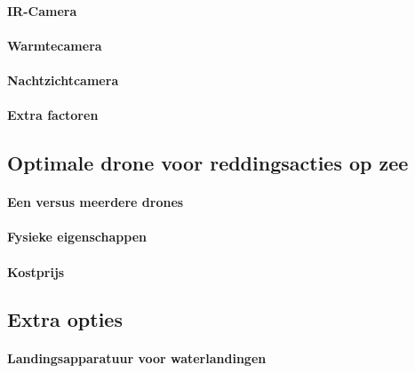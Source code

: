 \paragraph{IR-Camera}

\lipsum[1-2]

\paragraph{Warmtecamera}

\lipsum[1-2]

\paragraph{Nachtzichtcamera}

\lipsum[1-2]

\paragraph{Extra factoren}

\lipsum[1-2]

\subsection{Optimale drone voor reddingsacties op zee}

\paragraph{Een versus meerdere drones}

\lipsum[1-2]

\paragraph{Fysieke eigenschappen}

\lipsum[1-2]

\paragraph{Kostprijs}

\lipsum[1-2]

\subsection{Extra opties}

\paragraph{Landingsapparatuur voor waterlandingen}

